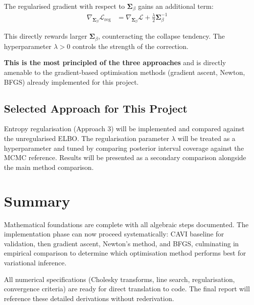 \documentclass[11pt]{article}
\begin{document}
The regularised gradient with respect to $\bm{\Sigma}_\beta$ gains an additional term:
\begin{align}
  \nabla_{\bm{\Sigma}_\beta} \mathcal{L}_{\text{reg}} &= \nabla_{\bm{\Sigma}_\beta} \mathcal{L} + \frac{\lambda}{2} \bm{\Sigma}_\beta^{-1}
\end{align}

This directly rewards larger $\bm{\Sigma}_\beta$, counteracting the collapse tendency. The hyperparameter $\lambda > 0$ controls the strength of the correction.

\textbf{This is the most principled of the three approaches} and is directly amenable to the gradient-based optimisation methods (gradient ascent, Newton, BFGS) already implemented for this project.

\subsection*{Selected Approach for This Project}

Entropy regularisation (Approach 3) will be implemented and compared against the unregularised ELBO. The regularisation parameter $\lambda$ will be treated as a hyperparameter and tuned by comparing posterior interval coverage against the MCMC reference. Results will be presented as a secondary comparison alongside the main method comparison.

\section*{Summary}

Mathematical foundations are complete with all algebraic steps documented. The implementation phase can now proceed systematically: CAVI baseline for validation, then gradient ascent, Newton's method, and BFGS, culminating in empirical comparison to determine which optimisation method performs best for variational inference.

All numerical specifications (Cholesky transforms, line search, regularisation, convergence criteria) are ready for direct translation to code. The final report will reference these detailed derivations without rederivation.
\end{document}
